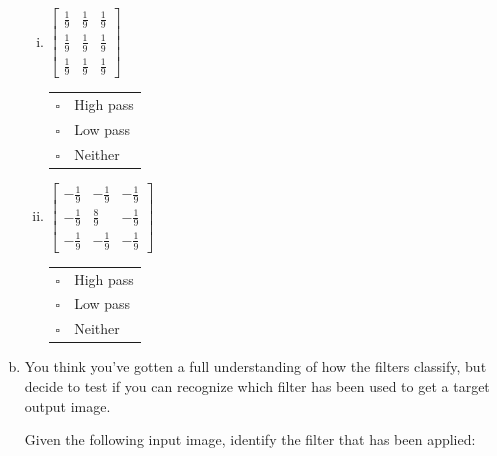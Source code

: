 \begin{enumerate}[(a)]
\begin{enumerate}[(i)]
\item
 $\begin{bmatrix}
    \frac{1}{9} & \frac{1}{9} & \frac{1}{9} \\
    \frac{1}{9} & \frac{1}{9} & \frac{1}{9} \\
    \frac{1}{9} & \frac{1}{9} & \frac{1}{9}
 \end{bmatrix}$
\begin{tabular}[h]{ll}
$\square$ & High pass \\
$\square$ & Low pass \\
$\square$ & Neither \\
\end{tabular}

\item
$\begin{bmatrix}
    -\frac{1}{9} & -\frac{1}{9} & -\frac{1}{9} \\
    -\frac{1}{9} & \frac{8}{9} & -\frac{1}{9} \\
    -\frac{1}{9} & -\frac{1}{9} & -\frac{1}{9}
  \end{bmatrix}$
\begin{tabular}[h]{ll}
$\square$ & High pass \\
$\square$ & Low pass \\
$\square$ & Neither \\
\end{tabular}
\end{enumerate}

\item
You think you've gotten a full understanding of how the filters classify, but decide to test if you can recognize which filter has been used to get a target output image. 

Given the following input image, identify the filter that has been applied:\\
 \\


\end{enumerate}
